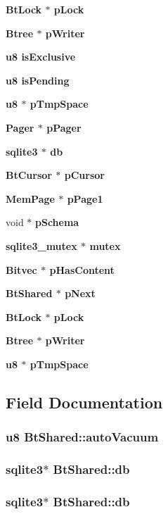 \begin{CompactItemize}
\bf{Bt\-Lock} $\ast$ \bf{p\-Lock}
\item 
\bf{Btree} $\ast$ \bf{p\-Writer}
\item 
\bf{u8} \bf{is\-Exclusive}
\item 
\bf{u8} \bf{is\-Pending}
\item 
\bf{u8} $\ast$ \bf{p\-Tmp\-Space}
\item 
\bf{Pager} $\ast$ \bf{p\-Pager}
\item 
\bf{sqlite3} $\ast$ \bf{db}
\item 
\bf{Bt\-Cursor} $\ast$ \bf{p\-Cursor}
\item 
\bf{Mem\-Page} $\ast$ \bf{p\-Page1}
\item 
void $\ast$ \bf{p\-Schema}
\item 
\bf{sqlite3\_\-mutex} $\ast$ \bf{mutex}
\item 
\bf{Bitvec} $\ast$ \bf{p\-Has\-Content}
\item 
\bf{Bt\-Shared} $\ast$ \bf{p\-Next}
\item 
\bf{Bt\-Lock} $\ast$ \bf{p\-Lock}
\item 
\bf{Btree} $\ast$ \bf{p\-Writer}
\item 
\bf{u8} $\ast$ \bf{p\-Tmp\-Space}
\end{CompactItemize}


\subsection{Field Documentation}
\subsubsection{\setlength{\rightskip}{0pt plus 5cm}\bf{u8} \bf{Bt\-Shared::auto\-Vacuum}}\label{structBtShared_b75b642b759129157d4721d83024fe4f}


\subsubsection{\setlength{\rightskip}{0pt plus 5cm}\bf{sqlite3}$\ast$ \bf{Bt\-Shared::db}}\label{structBtShared_5cae523753611fd4a4ea577fe81326a0}


\subsubsection{\setlength{\rightskip}{0pt plus 5cm}\bf{sqlite3}$\ast$ \bf{Bt\-Shared::db}}\label{structBtShared_5cae523753611fd4a4ea577fe81326a0}


